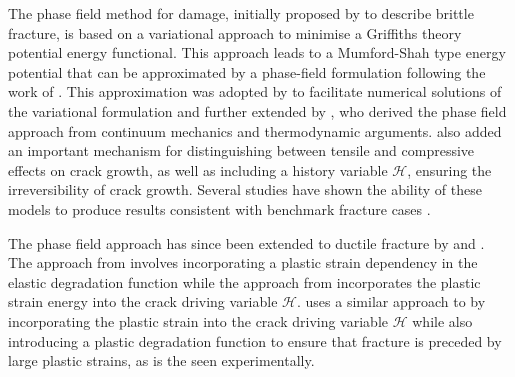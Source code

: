 \documentclass[sn-mathphys,Numbered]{sn-jnl}%
\begin{document}
The phase field method for damage, initially proposed by \citet{francfort_revisiting_1998} to describe brittle fracture, is based on a variational approach to minimise a Griffiths theory potential energy functional. %
This approach leads to a Mumford-Shah \cite{mumford_optimal_1989} type energy potential that can be approximated by a phase-field formulation following the work of \citet{ambrosio_approximation_1990}.
This approximation was adopted by \citet{bourdin_time-discrete_2011} to facilitate numerical solutions of the variational formulation and further extended by \citet{miehe_phase_2010}, who derived the phase field approach from continuum mechanics and thermodynamic arguments.
\citet{miehe_phase_2010} also added an important mechanism for distinguishing between tensile and compressive effects on crack growth, as well as including a history variable $\mathcal{H}$, ensuring the irreversibility of crack growth.
Several studies have shown the ability of these models to produce results consistent with benchmark fracture cases \cite{borden_phase-field_2012,miehe_phase_2010}.

The phase field approach has since been extended to ductile fracture by \citet{ambati_phase-field_2015, borden_phase-field_2016} and \citet{miehe_phase_2016}.
The approach from \citet{ambati_phase-field_2015} involves incorporating a plastic strain dependency in the elastic degradation function while the approach from \citet{miehe_phase_2016} incorporates the plastic strain energy into the crack driving variable $\mathcal{H}$.
\citet{borden_phase-field_2016} uses a similar approach to \citet{miehe_phase_2016} by incorporating the plastic strain into the crack driving variable $\mathcal{H}$ while also introducing a plastic degradation function to ensure that fracture is preceded by large plastic strains, as is the seen experimentally.
\end{document}
